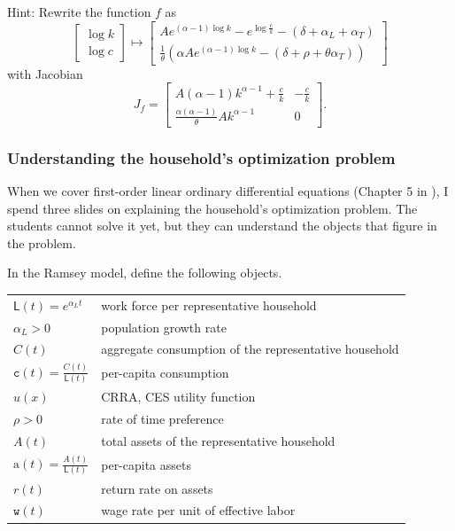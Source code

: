 \documentclass[10pt]{article}
\begin{document}
Hint: 	Rewrite the function $f$ as
\[
\left[\begin{array}{c}
\log k \\ \log c
\end{array}\right]
\mapsto
\left[\begin{array}{c}
A e^{(\alpha-1)\log k} - e^{\log \frac{c}{k}} - (\delta+\alpha_L+\alpha_T) \\ \frac{1}{\theta}\left(\alpha A e^{(\alpha-1)\log k} - (\delta + \rho + \theta\alpha_T )\right)
\end{array}\right]
\]
with Jacobian
\[
J_f = \left[\begin{array}{cc}
A(\alpha-1)k^{\alpha-1} + \frac{c}{k} & -\frac{c}{k} \\[.4ex]
\frac{\alpha(\alpha-1)}{\theta} A k^{\alpha -1} & 0
\end{array}\right].
\]



\subsubsection{Understanding the household's optimization problem}

When we cover first-order linear ordinary differential equations (Chapter 5 in \cite{Sydsaeter2008}), I spend three slides on explaining the household's optimization problem. The students cannot solve it yet, but they can understand the objects that figure in the problem.

In the Ramsey model, define the following objects.
\smallskip

\begin{tabular}{ll}
$\mathsf{L}(t) = e^{\alpha_L t}$ & work force per representative household\\
$\alpha_L>0$ & population growth rate \\
$C(t)$ & aggregate consumption of the representative household\\
$\texttt{c}(t)=\frac{C(t)}{\mathsf{L}(t)}$ & per-capita consumption\\
$u(x)$ & CRRA, CES utility function  \\
$\rho>0$ & rate of time preference \\
$A(t)$ & total assets of the representative household\\
$\text{a}(t) = \frac{A(t)}{\mathsf{L}(t)}$ & per-capita assets \\
$r(t)$ & return rate on assets \\
$\texttt{w}(t)$ & wage rate per unit of effective labor
\end{tabular}
\end{document}
